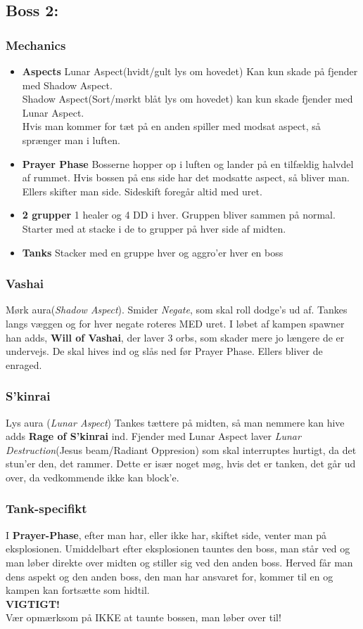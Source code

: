 \subsection*{Boss 2:}
\subsubsection*{Mechanics}
\begin{itemize}
  \item \textbf{Aspects} Lunar Aspect(hvidt/gult lys om hovedet) Kan kun skade
    på fjender med Shadow Aspect.\\
    Shadow Aspect(Sort/mørkt blåt lys om hovedet) kan kun skade fjender med
    Lunar Aspect.\\
    Hvis man kommer for tæt på en anden spiller med modsat aspect, så sprænger
    man i luften.
  \item \textbf{Prayer Phase} Bosserne hopper op i luften og lander på en
    tilfældig halvdel af rummet. Hvis bossen på ens side har det modsatte
    aspect, så bliver man. Ellers skifter man side. Sideskift foregår altid med
    uret.
  \item \textbf{2 grupper} 1 healer og 4 DD i hver. Gruppen bliver sammen på
    normal. Starter med at stacke i de to grupper på hver side af midten. 
  \item \textbf{Tanks} Stacker med en gruppe hver og aggro'er hver en boss

\end{itemize}
\subsubsection*{Vashai}
Mørk aura(\emph{Shadow Aspect}). Smider \emph{Negate}, som skal roll dodge's ud
af. Tankes langs væggen og for hver negate roteres MED uret. I løbet af kampen
spawner han adds, \textbf{Will of Vashai}, der laver 3 orbs, som skader mere jo
længere de er undervejs. De skal hives ind og slås ned før
Prayer Phase. Ellers bliver de enraged.
\subsubsection*{S'kinrai}
Lys aura (\emph{Lunar Aspect}) Tankes tættere på midten, så man nemmere kan
hive adds \textbf{Rage of S'kinrai} ind. Fjender med Lunar Aspect laver
\emph{Lunar Destruction}(Jesus beam/Radiant Oppresion) som skal interruptes
hurtigt, da det stun'er den, det rammer. Dette er især noget møg, hvis det er
tanken, det går ud over, da vedkommende ikke kan block'e.

\subsubsection*{Tank-specifikt}
I \textbf{Prayer-Phase}, efter man har, eller ikke har, skiftet side, venter
man på eksplosionen. Umiddelbart efter eksplosionen tauntes den boss, man står
ved og man løber direkte over midten og stiller sig ved den anden boss. Herved
får man dens aspekt og den anden boss, den man har ansvaret for, kommer til en
og kampen kan fortsætte som hidtil.\\
\textbf{VIGTIGT!}\\
Vær opmærksom på IKKE at taunte bossen, man løber over til!


